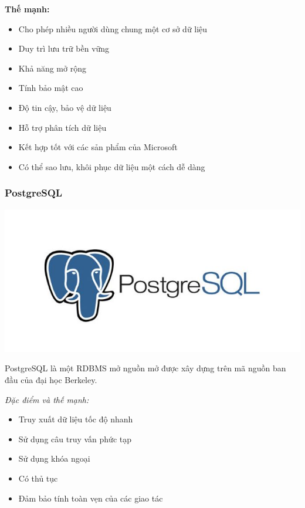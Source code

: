 \textbf{Thế mạnh:}
\begin{itemize}
    \item Cho phép nhiều người dùng chung một cơ sở dữ liệu
    \item Duy trì lưu trữ bền vững
    \item Khả năng mở rộng
    \item Tính bảo mật cao
    \item Độ tin cậy, bảo vệ dữ liệu
    \item Hỗ trợ phân tích dữ liệu
    \item Kết hợp tốt với các sản phẩm của Microsoft
    \item Có thể sao lưu, khôi phục dữ liệu một cách dễ dàng
\end{itemize}

\subsubsection{PostgreSQL}
\begin{center}
  \captionsetup{type=figure}
    \includegraphics[scale=0.5]{img/postgre-sql.jpg}
\end{center}

PostgreSQL là một RDBMS mở nguồn mở được xây dựng trên mã nguồn ban đầu của đại học Berkeley.

\textit{Đặc điểm và thế mạnh:}
\begin{itemize}
    \item Truy xuất dữ liệu tốc độ nhanh
    \item Sử dụng câu truy vấn phức tạp
    \item Sử dụng khóa ngoại
    \item Có thủ tục
    \item Đảm bảo tính toàn vẹn của các giao tác
\end{itemize}

